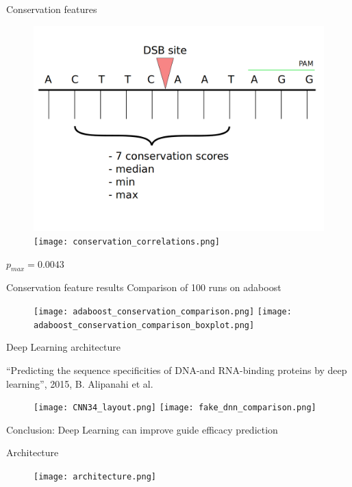 \documentclass[Nike]{tuberlinbeamer}
\begin{document}
\begin{frame}{Conservation features}
  \begin{figure}
    \includegraphics[width=0.45\linewidth]{Conservation_features.png}
    \hspace*{0.1in}
    \texttt{[image: conservation\_correlations.png]}
  \end{figure}
  \hspace*{3.1in}
  $p_{max}=0.0043$

\end{frame}

\begin{frame}{Conservation feature results}
  Comparison of 100 runs on adaboost
  \begin{figure}
    \texttt{[image: adaboost\_conservation\_comparison.png]}
    \hspace*{0.1in}
    \texttt{[image: adaboost\_conservation\_comparison\_boxplot.png]}
  \end{figure}
\end{frame}

\begin{frame}{Deep Learning architecture}
  \begin{flushright}
    \tiny
      ``Predicting the sequence specificities of DNA-and RNA-binding proteins by deep learning'', 2015, B. Alipanahi et al.\
  \end{flushright}
  \vspace*{-0.3in}
  \begin{figure}
    \texttt{[image: CNN34\_layout.png]}
    \pause
    \texttt{[image: fake\_dnn\_comparison.png]}
  \end{figure}

  Conclusion: Deep Learning can improve guide efficacy prediction
\end{frame}

\begin{frame}{Architecture}
  \begin{figure}
    \centering
    \texttt{[image: architecture.png]}
  \end{figure}
\end{frame}
\end{document}
